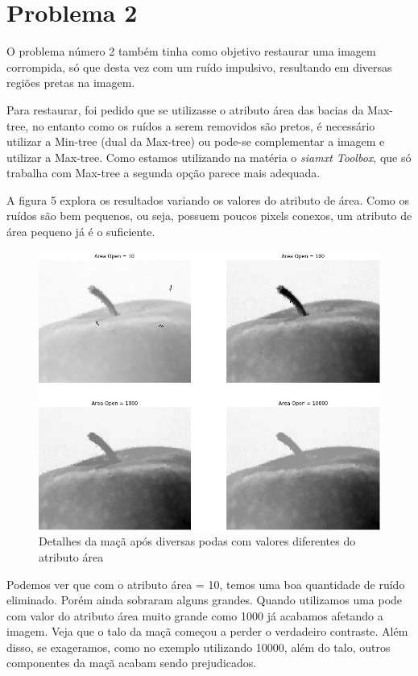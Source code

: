 \documentclass{article}
\begin{document}
	
	\section{Problema 2}
	
	O problema número 2 também tinha como objetivo restaurar uma imagem corrompida, só que desta vez com um ruído impulsivo, resultando em diversas regiões pretas na imagem. 
	
	Para restaurar, foi pedido que se utilizasse o atributo área das bacias da Max-tree, no entanto como os ruídos a serem removidos são pretos, é necessário utilizar a Min-tree (dual da Max-tree) ou pode-se complementar a imagem e utilizar a Max-tree. Como estamos utilizando na matéria o \textit{siamxt Toolbox}, que só trabalha com Max-tree a segunda opção parece mais adequada.
	
	A figura 5 explora os resultados variando os valores do atributo de área. Como os ruídos são bem pequenos, ou seja, possuem poucos pixels conexos, um atributo de área pequeno já é o suficiente. 
	
	\begin{figure}[H]
		\centering
		\includegraphics[scale=0.5]{images/2_maca_1.png}
		\caption{Detalhes da maçã após diversas podas com valores diferentes do atributo área}
	\end{figure}

	
	Podemos ver que com o atributo área = 10, temos uma boa quantidade de ruído eliminado. Porém ainda sobraram alguns grandes. Quando utilizamos uma pode com valor do atributo área muito grande como 1000 já acabamos afetando a imagem. Veja que o talo da maçã começou a perder o verdadeiro contraste. Além disso, se exageramos, como no exemplo utilizando 10000, além do talo, outros componentes da maçã acabam sendo prejudicados.
	
\end{document}
